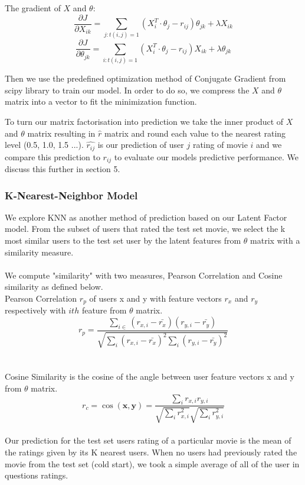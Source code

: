 \documentclass[12pt]{article}
\begin{document}
The gradient of $X$ and $\theta$:
$$\frac{\partial J}{\partial X_{ik}} = \sum_{j:t(i,j)=1}(X_i^T \cdot \theta_j - r_{ij})\theta_{jk}+\lambda X_{ik}$$
$$\frac{\partial J}{\partial \theta_{jk}} = \sum_{i:t(i,j)=1}(X_i^T \cdot \theta_j - r_{ij})X_{ik}+\lambda \theta_{jk}$$

Then we use the predefined optimization method of Conjugate Gradient from scipy library to train our model. In order to do so, we compress the $X$ and $\theta$ matrix into a vector to fit the minimization function.

To turn our matrix factorisation into prediction we take the inner product of $X$ and $\theta$ matrix resulting in $\hat{r}$ matrix and round each value to the nearest rating level (0.5, 1.0, 1.5 ...). $\hat{r_{ij}}$ is our prediction of user $j$ rating of movie $i$ and we compare this prediction to $r_{ij}$ to evaluate our models predictive performance. We discuss this further in section 5.

\subsubsection{K-Nearest-Neighbor Model}

We explore KNN as another method of prediction based on our Latent Factor model. From the subset of users that rated the test set movie, we select the k most similar users to the test set user by the latent features from $\theta$ matrix with a similarity measure.
\\ \\
We compute "similarity" with two measures, Pearson Correlation and Cosine similarity as defined below.
\\
Pearson Correlation $r_{p}$ of users x and y with feature vectors $r_{x}$ and $r_{y}$ respectively with $ith$ feature from $\theta$ matrix.  
$$r_{p} = \dfrac{ \sum_{i\in} (r_{x,i} - \bar{r_{x}})(r_{y,i} - \bar{r_{y}})}{\sqrt{\sum_{i} (r_{x,i} - \bar{r_{x}})^{2} \sum_{i} (r_{y,i} - \bar{r_{y}})^{2}}}$$ 
\\ \\
Cosine Similarity is the cosine of the angle between user feature vectors x and y from $\theta$ matrix.
$$r_{c} = \cos(\textbf{x},\textbf{y}) = \frac{\sum_{i} r_{x,i} r_{y,i} }{\sqrt{\sum_{i} r_{x,i}^2} \sqrt{\sum_{i} r_{y,i}^2}} $$
\\
Our prediction for the test set users rating of a particular movie is the mean of the ratings given by its K nearest users. When no users had previously rated the movie from the test set (cold start), we took a simple average of all of the user in questions ratings. 
\end{document}

